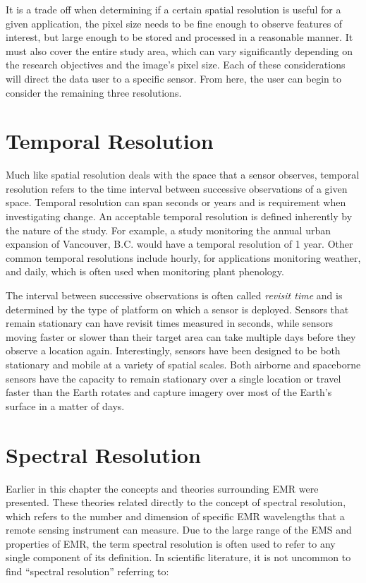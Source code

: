 \documentclass[
]{book}
\begin{document}
It is a trade off when determining if a certain spatial resolution is
useful for a given application, the pixel size needs to be fine enough
to observe features of interest, but large enough to be stored and
processed in a reasonable manner. It must also cover the entire study
area, which can vary significantly depending on the research objectives
and the image's pixel size. Each of these considerations will direct the
data user to a specific sensor. From here, the user can begin to
consider the remaining three resolutions.

\hypertarget{temporal-resolution}{%
\section{Temporal Resolution}\label{temporal-resolution}}

Much like spatial resolution deals with the space that a sensor
observes, temporal resolution refers to the time interval between
successive observations of a given space. Temporal resolution can span
seconds or years and is requirement when investigating change. An
acceptable temporal resolution is defined inherently by the nature of
the study. For example, a study monitoring the annual urban expansion of
Vancouver, B.C. would have a temporal resolution of 1 year. Other common
temporal resolutions include hourly, for applications monitoring
weather, and daily, which is often used when monitoring plant phenology.

The interval between successive observations is often called \emph{revisit
time} and is determined by the type of platform on which a sensor is
deployed. Sensors that remain stationary can have revisit times measured
in seconds, while sensors moving faster or slower than their target area
can take multiple days before they observe a location again.
Interestingly, sensors have been designed to be both stationary and
mobile at a variety of spatial scales. Both airborne and spaceborne
sensors have the capacity to remain stationary over a single location or
travel faster than the Earth rotates and capture imagery over most of
the Earth's surface in a matter of days.

\hypertarget{spectral-resolution}{%
\section{Spectral Resolution}\label{spectral-resolution}}

Earlier in this chapter the concepts and theories surrounding EMR were
presented. These theories related directly to the concept of spectral
resolution, which refers to the number and dimension of specific EMR
wavelengths that a remote sensing instrument can measure. Due to the
large range of the EMS and properties of EMR, the term spectral
resolution is often used to refer to any single component of its
definition. In scientific literature, it is not uncommon to find
``spectral resolution'' referring to:
\end{document}
